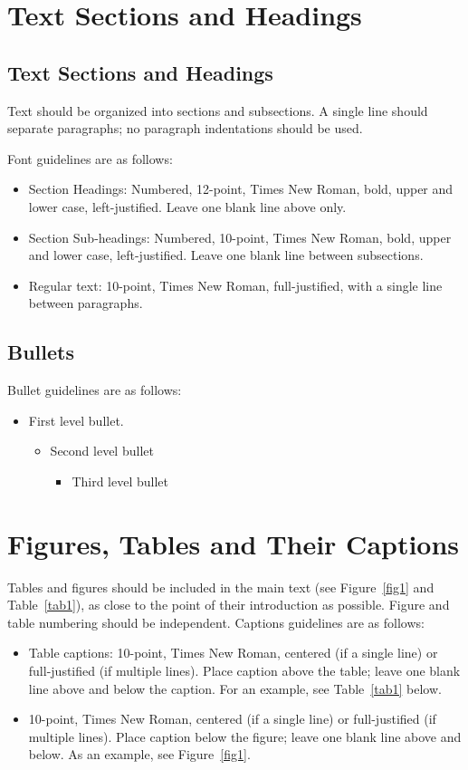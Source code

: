 \documentclass[review]{iise}%
\begin{document}
\section{Text Sections and Headings}
\subsection{Text Sections and Headings}
Text should be organized into sections and subsections.  A single line should separate paragraphs; no paragraph indentations should be used.  

Font guidelines are as follows:
\begin{itemize}
\item Section Headings: Numbered, 12-point, Times New Roman, bold, upper and lower case, left-justified. Leave one blank line above only.
\item Section Sub-headings: Numbered, 10-point, Times New Roman, bold, upper and lower case, left-justified. Leave one blank line between subsections.
\item Regular text: 10-point, Times New Roman, full-justified, with a single line between paragraphs.
\end{itemize}

\subsection{Bullets}
Bullet guidelines are as follows:
\begin{itemize}
	\item First level bullet.
	\begin{itemize}
		\item Second level bullet
		\begin{itemize}
			\item Third level bullet
		\end{itemize}
	\end{itemize}
\end{itemize}

\section{Figures, Tables and Their Captions}
Tables and figures should be included in the main text (see Figure~\ref{fig1} and Table~\ref{tab1}), as close to the point of their introduction as possible.  Figure and table numbering should be independent.  Captions guidelines are as follows:

\begin{itemize}
\item Table captions: 10-point, Times New Roman, centered (if a single line) or full-justified (if multiple lines). Place caption above the table; leave one blank line above and below the caption.  For an example, see Table~\ref{tab1} below.
\item 10-point, Times New Roman, centered (if a single line) or full-justified (if multiple lines). Place caption below the figure; leave one blank line above and below. As an example, see Figure~\ref{fig1}.
\end{itemize}
\end{document}
